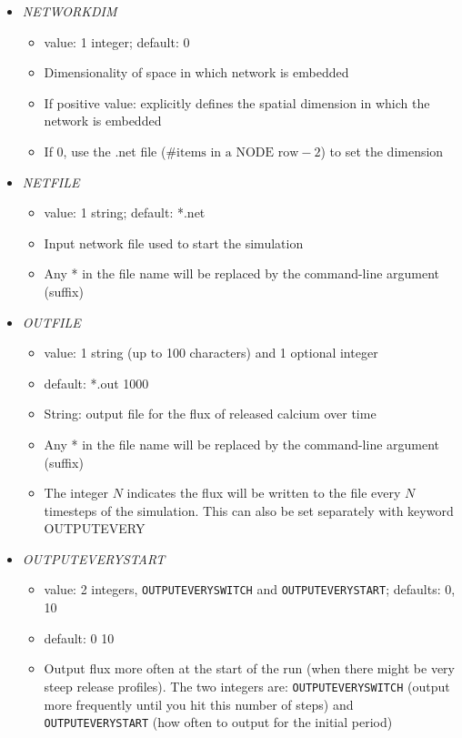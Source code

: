 \documentclass[12pt]{article}
\begin{document}
\begin{itemize}
\begin{itemize}
\end{itemize}
%
\item {\it NETWORKDIM}
	\begin{itemize}
		\item  value: 1 integer; default: 0
		\item Dimensionality of space in which network is embedded
		\item If positive value: explicitly defines the spatial dimension in which the network is embedded
		\item If 0, use the .net file ($\text{\# items in a NODE row} - 2$) to set the dimension
	\end{itemize}
%
\item {\it NETFILE}
\begin{itemize}
	\item  value: 1 string; default: *.net
	\item Input network file used to start the simulation
	 \item Any * in the file name will be replaced by the command-line argument (suffix)
\end{itemize}
%
\item {\it OUTFILE}
    \begin{itemize}
      \item  value: 1 string (up to 100 characters) and 1 optional integer
      \item  default: *.out 1000
      \item String: output file for the flux of released calcium over time      
      \item Any * in the file name will be replaced by the command-line argument (suffix)
      \item The integer $N$ indicates the flux will be written to the file every $N$ timesteps of the simulation. This can also be set separately with keyword OUTPUTEVERY
      \end{itemize}
%
\item {\it OUTPUTEVERYSTART}
\begin{itemize}
	\item  value: 2 integers, \verb=OUTPUTEVERYSWITCH= and \verb=OUTPUTEVERYSTART=; defaults: 0, 10
	\item  default: 0 10
	\item Output flux more often at the start of the run (when there might be very steep release profiles). The two integers are: \verb=OUTPUTEVERYSWITCH= (output more frequently until you hit this number of steps) and \verb=OUTPUTEVERYSTART= (how often to output for the initial period)

\end{itemize}
\end{itemize}
\end{document}
